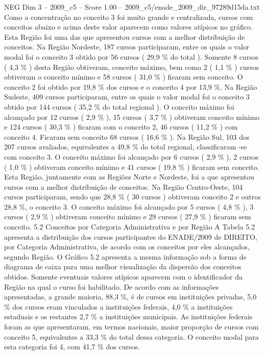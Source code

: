 \begin{textsample}{NEG Dim 3 – 2009\_c5 – Score 1.00 – 2009\_c5/enade\_2009\_dir\_97289d15da.txt}
Como a concentração no conceito 3 foi muito grande e centralizada, cursos com conceitos abaixo e acima deste valor aparecem como valores atípicos no gráfico.
Esta Região foi uma das que apresentou cursos com a melhor distribuição de conceitos.
Na Região Nordeste, 187 cursos participaram, entre os quais o valor modal foi o conceito 3 obtido por 56 cursos ( 29,9 \% do total ).
Somente 8 cursos ( 4,3 \% ) desta Região obtiveram, conceito máximo, bem como 2 ( 1,1 \% ) cursos obtiveram o conceito mínimo e 58 cursos ( 31,0 \% ) ficaram sem conceito.
O conceito 2 foi obtido por 19,8 \% dos cursos e o conceito 4 por 13,9 \%.
Na Região Sudeste, 409 cursos participaram, entre os quais o valor modal foi o conceito 3 obtido por 144 cursos ( 35,2 \% do total regional ).
O conceito máximo foi alcançado por 12 cursos ( 2,9 \% ), 15 cursos ( 3,7 \% ) obtiveram conceito mínimo e 124 cursos ( 30,3 \% ) ficaram com o conceito 2, 46 cursos ( 11,2 \% ) com conceito 4.
Ficaram sem conceito 68 cursos ( 16,6 \% ).
Na Região Sul, 103 dos 207 cursos avaliados, equivalentes a 49,8 \% do total regional, classificaram -se com conceito 3.
O conceito máximo foi alcançado por 6 cursos ( 2,9 \% ), 2 cursos ( 1,0 \% ) obtiveram conceito mínimo e 41 cursos ( 19,8 \% ) ficaram sem conceito.
Esta Região, juntamente com as Regiões Norte e Nordeste, foi a que apresentou cursos com a melhor distribuição de conceitos.
Na Região Centro-Oeste, 104 cursos participaram, sendo que 28,8 \% ( 30 cursos ) obtiveram conceito 2 e outros 28,8 \%, o conceito 3.
O conceito máximo foi alcançado por 5 cursos ( 4,8 \% ), 3 cursos ( 2,9 \% ) obtiveram conceito mínimo e 29 cursos ( 27,9 \% ) ficaram sem conceito. 5.2 Conceitos por Categoria Administrativa e por Região A Tabela 5.2 apresenta a distribuição dos cursos participantes do ENADE/2009 de DIREITO, por Categoria Administrativa, de acordo com os conceitos por eles alcançados, segundo Região.
O Gráfico 5.2 apresenta a mesma informação sob a forma de diagrama de caixa para uma melhor visualização da dispersão dos conceitos obtidos.
Somente eventuais valores atípicos aparecem com o identificador da Região na qual o curso foi habilitado.
De acordo com as informações apresentadas, a grande maioria, 88,3 \%, é de cursos em instituições privadas, 5,0 \% dos cursos eram vinculados a instituições federais, 4,0 \% a instituições estaduais e os restantes 2,7 \% a instituições municipais.
As instituições federais foram as que apresentaram, em termos nacionais, maior proporção de cursos com conceito 5, equivalentes a 33,3 \% do total dessa categoria.
O conceito modal para esta categoria foi 4, com 41,7 \% dos cursos.

\end{textsample}

